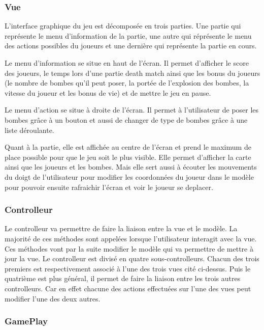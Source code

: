 	
	\subsubsection{Vue}
	
		L'interface graphique du jeu est décomposée en trois parties.
		Une partie qui représente le menu d'information de la partie, 
		une autre qui réprésente le menu des actions possibles du joueurs 
		et une dernière qui représente la partie en cours.
		
		Le menu d'information se situe en haut de l'écran.
		Il permet d'afficher le score des joueurs, le temps lors d'une partie 
		death match ainsi que les bonus du joueurs (le nombre de bombes qu'il 
		peut poser, la portée de l'explosion des bombes, la vitesse du joueur 
		et les bonus de vie) et de mettre le jeu en pause.
		
		Le menu d'action se situe à droite de l'écran.
		Il permet à l'utilisateur de poser les bombes grâce à un bouton 
		et aussi de changer de type de bombes grâce à une liste déroulante.
	
		Quant à la partie, elle est affichée au centre de l'écran et prend le 
		maximum de place possible pour que le jeu soit le plus visible.
		Elle permet d'afficher la carte ainsi que les joueurs et les bombes.
		Mais elle sert aussi à écouter les mouvements du doigt de l'utilisateur
		pour modifier les coordonnées du joueur dans le modèle pour pouvoir 
		ensuite rafraichir l'écran et voir le joueur se deplacer.	
	
	
	\subsubsection{Controlleur}
	
		Le controlleur va permettre de faire la liaison entre la vue et le modèle.
		La majorité de ces méthodes sont appelées lorsque l'utilisateur interagit avec la vue.
		Ces méthodes vont par la suite modifier le modèle qui va permettre de mettre à jour la vue.
		Le controlleur est divisé en quatre sous-controlleurs.
		Chacun des trois premiers est respectivement associé à l'une des trois vues cité ci-dessus.
		Puis le quatrième est plus général, il permet de faire la liaison entre les trois autres controlleurs.
		Car en effet chacune des actions effectuées sur l'une des vues peut modifier l'une des deux autres.
	
	\subsubsection{GamePlay}
	
